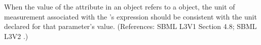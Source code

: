 When the value of the attribute  in an \InitialAssignment
object refers to a \Parameter object, the unit of measurement associated
with the \InitialAssignment's  expression should be consistent
with the unit declared for that parameter's value.  (References: SBML L3V1 Section 4.8; SBML
L3V2 .)
